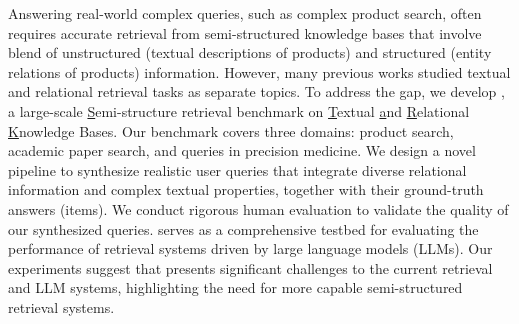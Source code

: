 

Answering real-world complex queries, such as complex product search, often requires accurate retrieval from semi-structured knowledge bases that involve blend of unstructured (\eg textual descriptions of products) and structured (\eg entity relations of products) information. 
However, many previous works studied textual and relational retrieval tasks as separate topics.
To address the gap, we develop \benchmarkt, a large-scale \underline{S}emi-structure retrieval benchmark on \underline{T}extual \underline{a}nd \underline{R}elational \underline{K}nowledge Bases.
Our benchmark covers three domains: product search, academic paper search, and queries in precision medicine.
We design a novel pipeline to synthesize realistic user queries that integrate diverse relational information and complex textual properties, together with their ground-truth answers (items). 
We conduct rigorous human evaluation to validate the quality of our synthesized queries. 
\benchmarkh serves as a comprehensive testbed for evaluating the performance of retrieval systems driven by large language models (LLMs). Our experiments suggest that \benchmarkh presents significant challenges to the current retrieval and LLM systems, 
highlighting the need for more capable semi-structured retrieval systems. %

